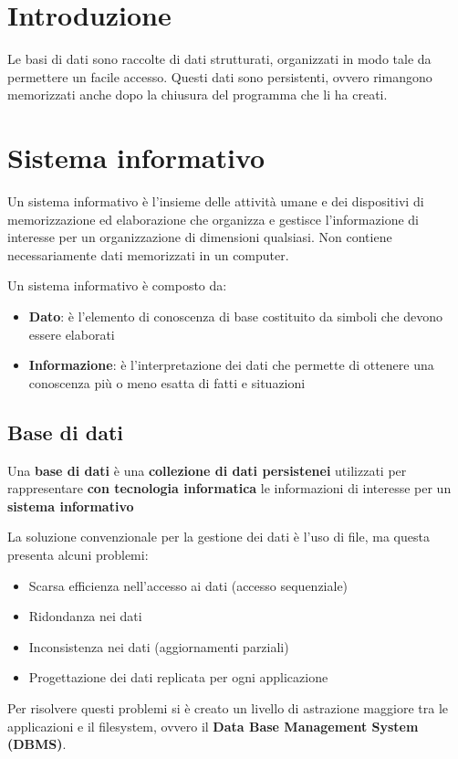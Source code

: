 \documentclass[a4paper]{article}
\begin{document}


\tableofcontents
\pagebreak

\section{Introduzione}
Le basi di dati sono raccolte di dati strutturati, organizzati in modo tale da permettere
un facile accesso. Questi dati sono persistenti, ovvero rimangono memorizzati anche dopo
la chiusura del programma che li ha creati.

\section{Sistema informativo}
Un sistema informativo è l'insieme delle attività umane e dei dispositivi di memorizzazione
ed elaborazione che organizza e gestisce l'informazione di interesse per un organizzazione
di dimensioni qualsiasi. Non contiene necessariamente dati memorizzati in un computer.

Un sistema informativo è composto da:
\begin{itemize}
  \item \textbf{Dato}: è l'elemento di conoscenza di base costituito da simboli che devono
    essere elaborati
  \item \textbf{Informazione}: è l'interpretazione dei dati che permette di ottenere una
    conoscenza più o meno esatta di fatti e situazioni
\end{itemize}


\subsection{Base di dati}
\begin{definition}
  Una \textbf{base di dati} è una \textbf{collezione di dati persistenei} utilizzati per
  rappresentare \textbf{con tecnologia informatica} le informazioni di interesse per un
  \textbf{sistema informativo}
\end{definition}
La soluzione convenzionale per la gestione dei dati è l'uso di file, ma questa presenta
alcuni problemi:
\begin{itemize}
  \item Scarsa efficienza nell'accesso ai dati (accesso sequenziale)
  \item Ridondanza nei dati
  \item Inconsistenza nei dati (aggiornamenti parziali)
  \item Progettazione dei dati replicata per ogni applicazione
\end{itemize}
Per risolvere questi problemi si è creato un livello di astrazione maggiore tra le
applicazioni e il filesystem, ovvero il \textbf{Data Base Management System (DBMS)}.
\end{document}
